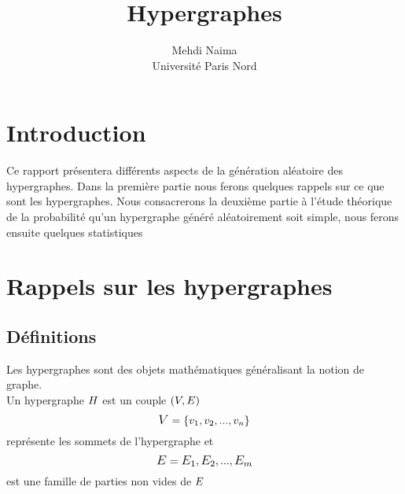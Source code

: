 \documentclass[a4paper,11pt]{article}
\author{Mehdi Naima\\ Université Paris Nord}
\title{Hypergraphes}
\begin{document}
\maketitle

\begin{abstract}

\end{abstract}


\newpage

\tableofcontents



\pagestyle{fancy}
\renewcommand\headrulewidth{0.5pt}
\fancyhead[R]{}



\newpage
\section*{Introduction}
Ce rapport présentera différents aspects de la génération aléatoire des hypergraphes. Dans la première partie nous ferons quelques rappels sur ce que sont les hypergraphes. Nous consacrerons la deuxième partie à l'étude théorique de la probabilité qu'un hypergraphe généré aléatoirement soit simple, nous ferons ensuite quelques statistiques 
\newpage

 


\section{Rappels sur les hypergraphes}


\subsection{Définitions}

Les hypergraphes sont des objets mathématiques généralisant la notion de graphe. \\
Un hypergraphe $\mathlarger{H}$ est un couple $\mathlarger{(V,E)}$\\
 \[\mathlarger{V} = \{v_{1},v_{2},...,v_{n}\} \] représente les sommets de l'hypergraphe et \[\mathlarger{E} = \mathlarger{E_{1}},  \mathlarger{E_{2}},...,\mathlarger{E_{m}} \]  est une famille de parties non vides de $\mathlarger{E}$
\end{document}

